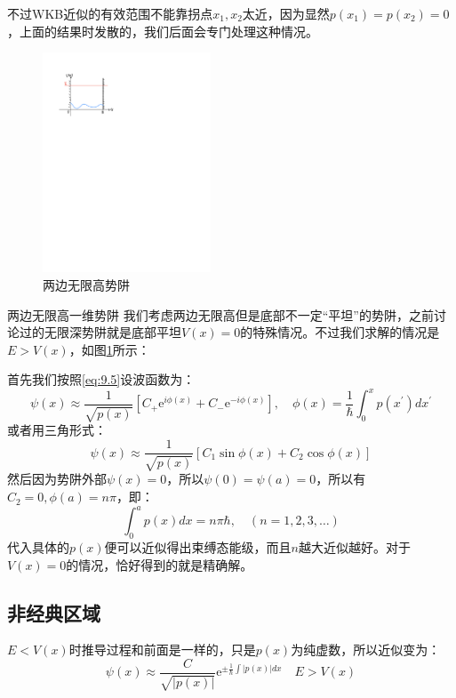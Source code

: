 \documentclass[a4paper,zihao=-4,linespread=1]{ctexrep}
\begin{document}
    
    不过WKB近似的有效范围不能靠拐点$x_1,x_2$太近，因为显然$p(x_1)=p(x_2)=0$，上面的结果时发散的，我们后面会专门处理这种情况。
    \begin{figure}[h]
        \centering
        \includegraphics[width=5cm]{fig/9-2.pdf}
        \caption{两边无限高势阱}
        \label{fig:9.2}
    \end{figure}
    \begin{example}{两边无限高一维势阱}
        我们考虑两边无限高但是底部不一定“平坦”的势阱，之前讨论过的无限深势阱就是底部平坦$V(x)=0$的特殊情况。不过我们求解的情况是$E>V(x)$，如图\ref{fig:9.2}所示：
        
        首先我们按照\ref{eq:9.5}设波函数为：
        \[\psi(x)\approx\frac{1}{\sqrt{p(x)}}\left[C_+\mathrm{e}^{i\phi(x)}+C_-\mathrm{e}^{-i\phi(x)}\right],\quad \phi(x)=\frac{1}{\hbar}\int_{0}^{x}p(x^\prime)dx^\prime\]
        或者用三角形式：
        \[\psi(x)\approx\frac{1}{\sqrt{p(x)}}\left[C_1\sin\phi(x)+C_2\cos\phi(x)\right]\]
        然后因为势阱外部$\psi(x)=0$，所以$\psi(0)=\psi(a)=0$，所以有$C_2=0,\phi(a)=n\pi$，即：
        \begin{equation}
            \label{eq:9.6}
            \boxed{\int_{0}^{a}p(x)dx=n\pi\hbar,\quad \left(n=1,2,3,\ldots\right)}
        \end{equation}
        代入具体的$p(x)$便可以近似得出束缚态能级，而且$n$越大近似越好。对于$V(x)=0$的情况，恰好得到的就是精确解。
    \end{example}
    \subsection*{非经典区域}
        $E<V(x)$时推导过程和前面是一样的，只是$p(x)$为纯虚数，所以近似变为：
        \begin{equation}
            \boxed{\psi(x)\approx\frac{C}{\sqrt{|p(x)|}}\mathrm{e}^{\pm\frac{1}{\hbar}\int |p(x)|dx}\quad E>V(x)}
        \end{equation}
\end{document}
